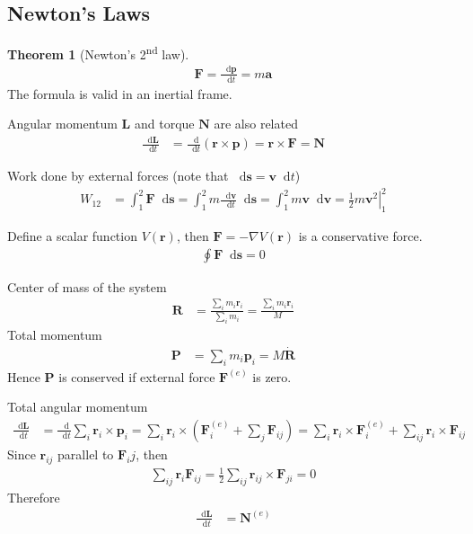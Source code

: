 \documentclass[twoside,9pt]{article}
\numberwithin{equation}{section} %
\newcommand{\lms}{\fontfamily{lmss}\selectfont} %
\renewcommand*\d{\mathop{}\!\mathrm{d}}
\theoremstyle{definition}
\newtheorem{theorem}{\lms Theorem}[section]
\theoremstyle{remark}
\begin{document}
\subsection{Newton's Laws}
\begin{theorem}[Newton's 2\textsuperscript{nd} law]
\begin{align}
    \mathbf{F} = \frac{\d \mathbf{p}}{\d t} = m\mathbf{a}
\end{align}
The formula is valid in an inertial frame.
\end{theorem}
Angular momentum $\mathbf{L}$ and torque $\mathbf{N}$ are also related
\begin{align}
    \frac{\d\mathbf{L}}{\d t} &= 
    \frac{\d}{\d t}(\mathbf{r}\times\mathbf{p})
    = \mathbf{r}\times\mathbf{F}
    = \mathbf{N}
\end{align}

Work done by external forces (note that $\d\mathbf{s}=\mathbf{v}\d t$)
\begin{align}
    W_{12} &= \int_1^2\mathbf{F}\d\mathbf{s}
    = \int_1^2 m\frac{\d\mathbf{v}}{\d t}\d\mathbf{s}
    = \int_1^2 m\mathbf{v}\d\mathbf{v}
    = \left.\frac{1}{2}m\mathbf{v}^2\right|_1^2
\end{align}

Define a scalar function $V(\mathbf{r})$,
then $\mathbf{F}=-\nabla V(\mathbf{r})$ is a conservative force.
\begin{align}
    \oint \mathbf{F}\d\mathbf{s} = 0
\end{align}

Center of mass of the system
\begin{align}
    \mathbf{R} &= 
    \frac{\sum_i m_i\mathbf{r}_i}{\sum_i m_i}
    =
    \frac{\sum_i m_i\mathbf{r}_i}{M}
\end{align}
Total momentum
\begin{align}
    \mathbf{P} 
    &= 
    \sum_i m_i\mathbf{p}_i
    = M\dot{\mathbf{R}}
\end{align}
Hence $\mathbf{P}$ is conserved if external force $\mathbf{F}^{(e)}$ is
zero.

Total angular momentum
\begin{align*}
    \frac{\d \mathbf{L}}{\d t} &= 
    \frac{\d }{\d t} \sum_i\mathbf{r}_i\times\mathbf{p}_i
    = \sum_i \mathbf{r}_i\times \left(
        \mathbf{F}_i^{(e)} + \sum_j \mathbf{F}_{ij}
    \right)
    = \sum_i\mathbf{r}_i\times\mathbf{F}_i^{(e)}
    + \sum_{ij}\mathbf{r}_i\times\mathbf{F}_{ij}
\end{align*}
Since $\mathbf{r}_{ij}$ parallel to $\mathbf{F}_ij$, then
\begin{align}
    \sum_{ij}\mathbf{r}_i\mathbf{F}_{ij} = 
    \frac{1}{2}\sum_{ij}\mathbf{r}_{ij}\times\mathbf{F}_{ji} = 0
\end{align}
Therefore
\begin{align}
    \frac{\d\mathbf{L}}{\d t} &= \mathbf{N}^{(e)}
\end{align}
\end{document}
